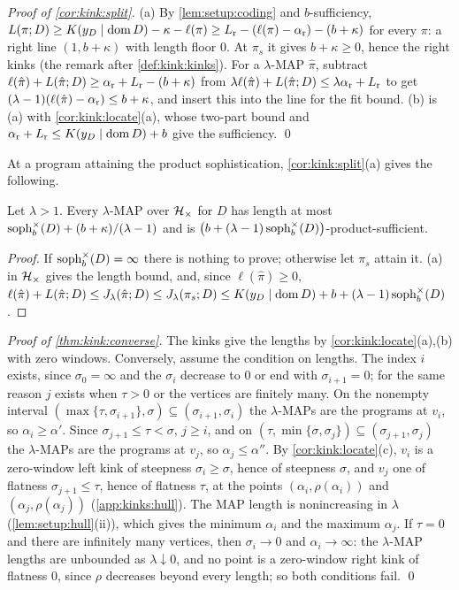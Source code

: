 \emph{Proof of \cref{cor:kink:split}.} (a) By \cref{lem:setup:coding} and $b$-sufficiency, $L(\pi;D)\ge K(y_D\mid\operatorname{dom} D)-\kappa-\ell(\pi)\ge L_{\rm r}-(\ell(\pi)-\alpha_{\rm r})-(b+\kappa)$ for every $\pi$: a right line $(1,b+\kappa)$ with length floor $0$. At $\pi_s$ it gives $b+\kappa\ge0$, hence the right kinks (the remark after \cref{def:kink:kinks}). For a $\lambda$-MAP $\hat\pi$, subtract $\ell(\hat\pi)+L(\hat\pi;D)\ge\alpha_{\rm r}+L_{\rm r}-(b+\kappa)$ from $\lambda\ell(\hat\pi)+L(\hat\pi;D)\le\lambda\alpha_{\rm r}+L_{\rm r}$ to get $(\lambda-1)(\ell(\hat\pi)-\alpha_{\rm r})\le b+\kappa$, and insert this into the line for the fit bound. (b) is (a) with \cref{cor:kink:locate}(a), whose two-part bound and $\alpha_{\rm r}+L_{\rm r}\le K(y_D\mid\operatorname{dom} D)+b$ give the sufficiency. \qed

At a program attaining the product sophistication, \cref{cor:kink:split}(a) gives the following.

\begin{proposition}\label{prop:algstat:product}
Let $\lambda>1$. Every $\lambda$-MAP over $\mathcal{H}_{\times}$ for $D$ has length at most $\operatorname{soph}^{\times}_b(D)+(b+\kappa)/(\lambda-1)$ and is $\big(b+(\lambda-1)\operatorname{soph}^{\times}_b(D)\big)$-product-sufficient.
\end{proposition}

\begin{proof}
If $\operatorname{soph}^{\times}_b(D)=\infty$ there is nothing to prove; otherwise let $\pi_s$ attain it. (a) in $\mathcal{H}_{\times}$ gives the length bound, and, since $\ell(\hat\pi)\ge0$, $\ell(\hat\pi)+L(\hat\pi;D)\le J_\lambda(\hat\pi;D)\le J_\lambda(\pi_s;D)\le K(y_D\mid\operatorname{dom} D)+b+(\lambda-1)\operatorname{soph}^{\times}_b(D)$.
\end{proof}

\emph{Proof of \cref{thm:kink:converse}.} The kinks give the lengths by \cref{cor:kink:locate}(a),(b) with zero windows. Conversely, assume the condition on lengths. The index $i$ exists, since $\sigma_0=\infty$ and the $\sigma_i$ decrease to $0$ or end with $\sigma_{i+1}=0$; for the same reason $j$ exists when $\tau>0$ or the vertices are finitely many. On the nonempty interval $(\max\{\tau,\sigma_{i+1}\},\sigma)\subseteq(\sigma_{i+1},\sigma_i)$ the $\lambda$-MAPs are the programs at $v_i$, so $\alpha_i\ge\alpha'$. Since $\sigma_{j+1}\le\tau<\sigma$, $j\ge i$, and on $(\tau,\min\{\sigma,\sigma_j\})\subseteq(\sigma_{j+1},\sigma_j)$ the $\lambda$-MAPs are the programs at $v_j$, so $\alpha_j\le\alpha''$. By \cref{cor:kink:locate}(c), $v_i$ is a zero-window left kink of steepness $\sigma_i\ge\sigma$, hence of steepness $\sigma$, and $v_j$ one of flatness $\sigma_{j+1}\le\tau$, hence of flatness $\tau$, at the points $(\alpha_i,\rho(\alpha_i))$ and $(\alpha_j,\rho(\alpha_j))$ (\cref{app:kinks:hull}). The MAP length is nonincreasing in $\lambda$ (\cref{lem:setup:hull}(ii)), which gives the minimum $\alpha_i$ and the maximum $\alpha_j$. If $\tau=0$ and there are infinitely many vertices, then $\sigma_i\to0$ and $\alpha_i\to\infty$: the $\lambda$-MAP lengths are unbounded as $\lambda\downarrow0$, and no point is a zero-window right kink of flatness $0$, since $\rho$ decreases beyond every length; so both conditions fail. \qed

